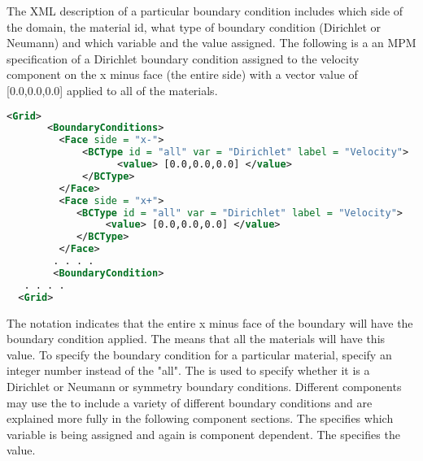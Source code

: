The XML description of a particular boundary condition includes which
side of the domain, the material id, what type of boundary condition
(Dirichlet or Neumann) and which variable and the value assigned.  The
following is a an MPM specification of a Dirichlet boundary condition
assigned to the velocity component on the x minus face (the entire
side) with a vector value of [0.0,0.0,0.0] applied to all of the materials.

\begin{lstlisting}[language=XML]
 <Grid>
       <BoundaryConditions>
         <Face side = "x-">
             <BCType id = "all" var = "Dirichlet" label = "Velocity">
                   <value> [0.0,0.0,0.0] </value>
             </BCType>
         </Face>
         <Face side = "x+">
            <BCType id = "all" var = "Dirichlet" label = "Velocity">
                 <value> [0.0,0.0,0.0] </value>
            </BCType>
         </Face>
        . . . .
        <BoundaryCondition>
   . . . .
  <Grid>
\end{lstlisting}

The notation  indicates that the
entire x minus face of the boundary will have the boundary condition
applied.  The  means that all the
materials will have this value.  To specify the boundary condition for
a particular material, specify an integer number instead of the
"all".  The  is used to specify
whether it is a Dirichlet or Neumann or symmetry boundary conditions.
Different components may use the  to include a
variety of different boundary conditions and are explained more fully
in the following component sections.  The 
specifies which variable is being assigned and again is
component dependent.  The 
specifies the value.

